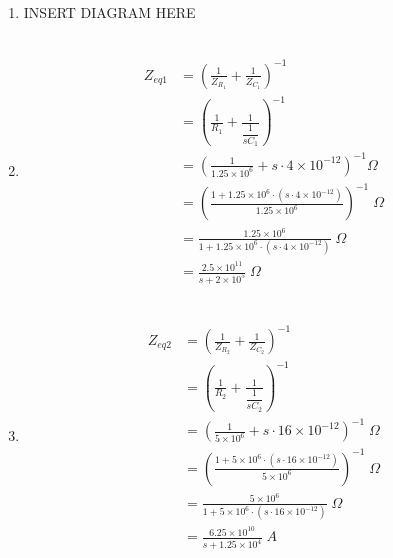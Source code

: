 

\begin{enumerate}
	\item{
	
	INSERT DIAGRAM HERE
	\\ \\
	}

	\item{
		\begin{align*}
		Z_{eq1} &= \left( \frac{1}{Z_{R_1}} +								%
		\frac{1}{Z_{C_1}} \right)^{-1}\\
		&= \left( \frac{1}{R_1} + \frac{1}{\dfrac{1}{sC_1} } \right)^{-1}\\
		&= \left(\frac{1}{1.25 \times 10^6} + 								%
		s \cdot 4 \times 10^{-12}\right)^{-1} \Omega\\
		&= \left(\frac{1 + 1.25\times 10^6 \cdot (s \cdot 4 \times 10^{-12})%
		}{ 1.25\times 10^6} \right)^{-1} \; \Omega\\
		&= \frac{1.25\times 10^6}{1 + 1.25\times 10^6 						%
		\cdot (s \cdot 4 \times 10^{-12})} \; \Omega\\
		&= \frac{2.5 \times 10^{11}}{s + 2 \times 10^5} \; \Omega
		\end{align*}
		\\
	}

	\item{
		\begin{align*}
		Z_{eq2} &= \left( \frac{1}{Z_{R_2}} +								%
		\frac{1}{Z_{C_2}} \right)^{-1}\\
		&= \left( \frac{1}{R_2} + \frac{1}{\dfrac{1}{sC_2} } \right)^{-1}\\
		&= \left( \frac{1}{5\times 10^6} +									%
		s \cdot 16 \times 10^{-12} \right)^{-1} \; \Omega\\
		&= \left( \frac{1 + 5\times 10^6 \cdot								%
		(s \cdot 16 \times 10^{-12})}{5\times 10^6} \right)^{-1} \; \Omega\\
		&= \frac{5 \times 10^6}{1 + 5\times 10^6 							%
		\cdot(s \cdot 16 \times 10^{-12})} \; \Omega \\
		&= \frac{6.25 \times 10^{10}}{s + 1.25 \times 10^4} \; A
		\end{align*}
		\\
	}


\end{enumerate}
